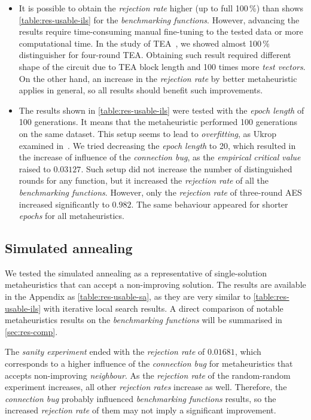 \documentclass[
    digital,    %
    oneside,    %
    color,
    11pt,
    nocover,
    notable,
    nolof,
    nolot,
]{fithesis3}
\begin{document}
\begin{itemize}
    \item It is possible to obtain the \textit{rejection rate} higher (up to full 100\,\%) than shows \cref{table:res-usable-ils} for the \textit{benchmarking functions}. However, advancing the results require time-consuming manual fine-tuning to the tested data or more computational time. In the study of TEA~\cite{kubicek2016new}, we showed almost 100\,\% distinguisher for four-round TEA. Obtaining such result required different shape of the circuit due to TEA block length and 100 times more \textit{test vectors}. On the other hand, an increase in the \textit{rejection rate} by better metaheuristic applies in general, so all results should benefit such improvements.
    
    \item The results shown in \cref{table:res-usable-ils} were tested with the \textit{epoch length} of 100 generations. It means that the metaheuristic performed 100 generations on the same dataset. This setup seems to lead to \textit{overfitting}, as Ukrop examined in~\cite[Section~7.1]{ukropBcThesis}. We tried decreasing the \textit{epoch length} to 20, which resulted in the increase of influence of the \textit{connection bug}, as the \textit{empirical critical value} raised to $0.03127$. Such setup did not increase the number of distinguished rounds for any function, but it increased the \textit{rejection rate} of all the \textit{benchmarking functions}. However, only the \textit{rejection rate} of three-round AES increased significantly to $0.982$. The same behaviour appeared for shorter \textit{epochs} for all metaheuristics.
\end{itemize}

\subsection{Simulated annealing}
\label{subsec:res-ss-sa}

We tested the simulated annealing as a representative of single-solution metaheuristics that can accept a non-improving solution. The results are available in the Appendix as \cref{table:res-usable-sa}, as they are very similar to \cref{table:res-usable-ils} with iterative local search results. A direct comparison of notable metaheuristics results on the \textit{benchmarking functions} will be summarised in \cref{sec:res-comp}.

The \textit{sanity experiment} ended with the \textit{rejection rate} of $0.01681$, which corresponds to a higher influence of the \textit{connection bug} for metaheuristics that accepts non-improving \textit{neighbour}. As the \textit{rejection rate} of the random-random experiment increases, all other \textit{rejection rates} increase as well. Therefore, the \textit{connection bug} probably influenced \textit{benchmarking functions} results, so the increased \textit{rejection rate} of them may not imply a significant improvement.
\end{document}
